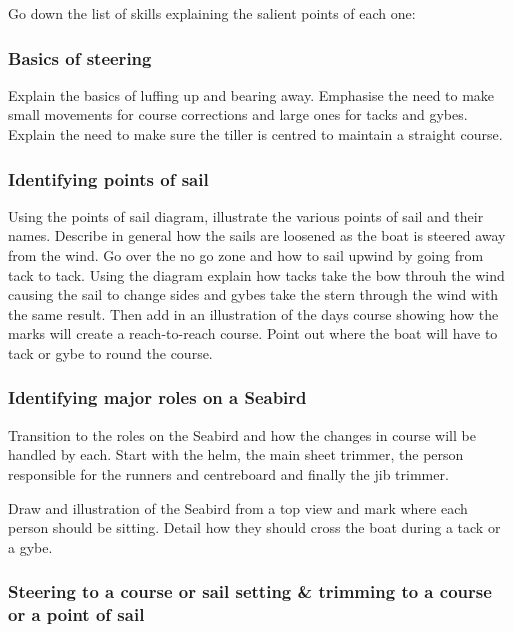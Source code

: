 \documentclass[12pt]{scrartcl}
\begin{document}
Go down the list of skills explaining the salient points of each one:

\subsubsection{Basics of steering} \label{subsubsection:basics of steering}

Explain the basics of luffing up and bearing away. Emphasise the need to make small movements for course corrections and large ones for tacks and gybes. Explain the need to make sure the tiller is centred to maintain a straight course.

\subsubsection{Identifying points of sail} \label{subsubsec:points of sail}

Using the points of sail diagram, illustrate the various points of sail and their names. Describe in general how the sails are loosened as the boat is steered away from the wind. Go over the no go zone and how to sail upwind by going from tack to tack. Using the diagram explain how tacks take the bow throuh the wind causing the sail to change sides and gybes take the stern through the wind with the same result. Then add in an illustration of the days course showing how the marks will create a reach-to-reach course. Point out where the boat will have to tack or gybe to round the course.

\subsubsection{Identifying major roles on a Seabird} \label{subsubsec:identifying major roles}

Transition to the roles on the Seabird and how the changes in course will be handled by each. Start with the helm, the main sheet trimmer, the person responsible for the runners and centreboard and finally the jib trimmer.

Draw and illustration of the Seabird from a top view and mark where each person should be sitting. Detail how they should cross the boat during a tack or a gybe.

\subsubsection{Steering to a course or sail setting \& trimming to a course or a point of sail} \label{subsubsec:steering and trimming}
\end{document}

